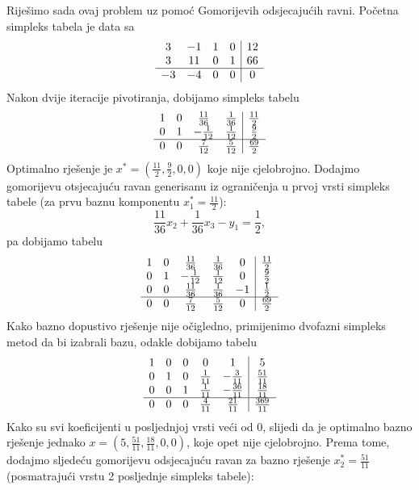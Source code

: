 \documentclass[a4paper, utf8, 11pt, colorlinks]{article}
\begin{document}
Riješimo sada ovaj problem uz pomoć Gomorijevih odsjecajućih ravni. 
Početna simpleks tabela je data sa 
$$\begin{array}{ccc c| c}
    3  & -1 & 1 &  0  & 12  \\
    3  & 11 & 0 &  1  & 66 \\ \hline
   -3  & -4 & 0 &  0  & 0
\end{array}$$
Nakon dvije iteracije pivotiranja, dobijamo simpleks tabelu 
$$\begin{array}{ccc c| c}
1 & 0 &  \frac{11}{36}   &  \frac{1}{36}  &  \frac{11}{2} \\
0 & 1 &  -\frac{1}{12}  &  \frac{1}{12}  &  \frac{9}{2}   \\ \hline
0 & 0 &  \frac{7}{12}   &  \frac{5}{12}  &  \frac{69}{2}
\end{array} $$
Optimalno rješenje je $x^* = (\frac{11}{2}, \frac{9}{2}, 0, 0)$ koje nije cjelobrojno. Dodajmo gomorijevu otsjecajuću ravan generisanu iz ograničenja u prvoj vrsti simpleks tabele (za prvu baznu komponentu $x_1^* = \frac{11}{2}$):
$$  \frac{11}{36} x_2 + \frac{1}{36} x_3 - y_1 = \frac{1}{2},$$
pa dobijamo tabelu 
$$\begin{array}{ccccc| c}
1 &  0 &   \frac{11}{36}  & \frac{1}{36}   &  0 & \frac{11}{2} \\
0 &  1 &   -\frac{1}{12}  & \frac{1}{12}   &  0 & \frac{9}{2} \\
0 &  0 &  \frac{11}{36}   &  \frac{1}{36}  & -1 & \frac{1}{2} \\ \hline
0 & 0  &  \frac{7}{12}    & \frac{5}{12}   &  0 & \frac{69}{2}
\end{array} $$
Kako bazno dopustivo rješenje nije očigledno, primijenimo dvofazni simpleks metod da bi izabrali bazu, odakle dobijamo tabelu 
$$\begin{array}{ccccc| c}
1   &   0       &   0   &   0             & 1              & 5 \\
0   &   1       &   0   &   \frac{1}{11}  & -\frac{3}{11}  & \frac{51}{11} \\
0   &   0       &   1   &   \frac{1}{11}  & -\frac{36}{11} &  \frac{18}{11} \\ \hline
0   &   0       &   0   &   \frac{4}{11}  & \frac{21}{11}  &  \frac{369}{11} \\
\end{array} $$
Kako su svi koeficijenti u posljednjoj vrsti veći od 0, slijedi da je optimalno bazno rješenje jednako $x=(5, \frac{51}{11}, \frac{18}{11}, 0, 0)$, koje opet nije cjelobrojno. 
 Prema tome, dodajmo sljedeću gomorijevu odsjecajuću ravan za bazno rješenje $x^*_2 = \frac{51}{11}$ (posmatrajući vrstu 2 posljednje simpleks tabele):
 
\end{document}
